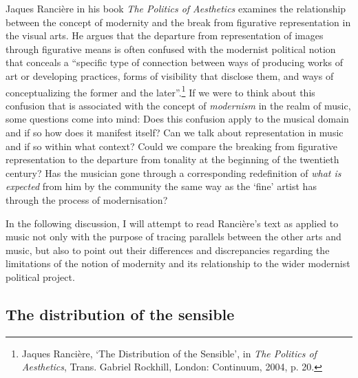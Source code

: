 Jaques Ranci\`{e}re in his book \emph{The Politics of Aesthetics} examines the relationship between the concept of modernity and the break from figurative representation in the visual arts. He argues that the departure from representation of images through figurative means is often confused with the modernist political notion that conceals a ``specific type of connection between ways of producing works of art or developing practices, forms of visibility that disclose them, and ways of conceptualizing the former and the later''.\footnote{Jaques Ranci\`{e}re, `The Distribution of the Sensible', in \emph{The Politics of Aesthetics}, Trans. Gabriel Rockhill, London: Continuum, 2004, p. 20.} If we were to think about this confusion that is associated with the concept of \emph{modernism} in the realm of music, some questions come into mind: Does this confusion apply to the musical domain and if so how does it manifest itself? Can we talk about representation in music and if so within what context? Could we compare the breaking from figurative representation to the departure from tonality at the beginning of the twentieth century? Has the musician gone through a corresponding redefinition of \emph{what is expected} from him by the community the same way as the `fine' artist has through the process of modernisation?

In the following discussion, I will attempt to read Ranci\`{e}re's text as applied to music not only with the purpose of tracing parallels between the other arts and music, but also to point out their differences and discrepancies regarding the limitations of the notion of modernity and its relationship to the wider modernist political project.

\subsection{The distribution of the sensible}


